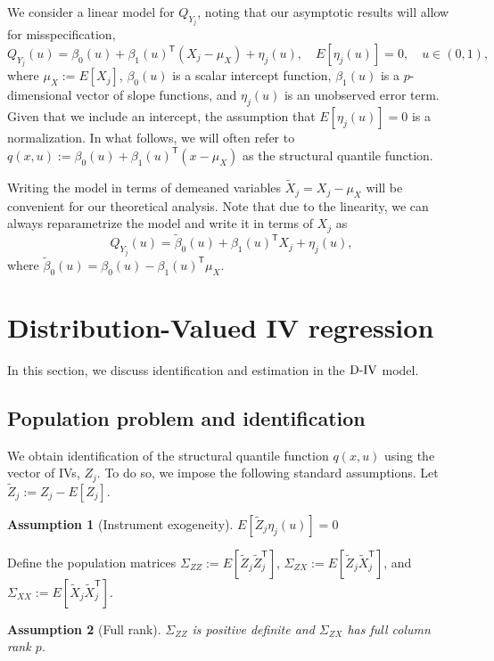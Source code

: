 \documentclass[12pt]{article}
\newcommand{\T}{\mathsf{T}} %
\newcommand{\est}{\ensuremath{\textnormal{D-IV}}\xspace}
\newtheorem{assumption}{Assumption}
\begin{document}
We consider a linear model for $Q_{Y_j}$, noting that our asymptotic results will allow for misspecification,
\begin{equation}\label{eq:linear_model}
  Q_{Y_j}(u) = \beta_0(u) + \beta_1(u)^{\!\T}(X_j-\mu_X) + \eta_j(u), \quad E[\eta_j(u)]=0, \quad u\in (0,1),
\end{equation}
where $\mu_X:=E[X_j]$, $\beta_0(u)$ is a scalar intercept function, $\beta_1(u)$ is a $p$-dimensional vector of slope functions, and $\eta_j(u)$ is an unobserved error term. Given that we include an intercept, the assumption that $E[\eta_j(u)]=0$ is a normalization. In what follows, we will often refer to $q(x,u):=\beta_0(u) + \beta_1(u)^{\!\T}(x-\mu_X)$ as the structural quantile function.

Writing the model in terms of demeaned variables $\tilde{X}_j=X_j-\mu_X$ will be convenient for our theoretical analysis. Note that due to the linearity, we can always reparametrize the model and write it in terms of $X_j$ as
\begin{equation*}
  Q_{Y_j}(u) = \tilde\beta_0(u) + \beta_1(u)^{\!\T}X_j + \eta_j(u),
\end{equation*}
where $\tilde\beta_0(u)=\beta_0(u)-\beta_1(u)^{\!\T}\mu_X$.

\section{Distribution-Valued IV regression}

In this section, we discuss identification and estimation in the \est model.

\subsection{Population problem and identification}
\label{sec:population_fivr_problem_identification}
We obtain identification of the structural quantile function $q(x,u)$ using the vector of IVs, $Z_j$. To do so, we impose the following standard assumptions. Let $\tilde{Z}_j:=Z_j-E[Z_j]$.
\begin{assumption}[Instrument exogeneity]\label{ass:instrument_exogeneity} $E\left[\tilde{Z}_j\eta_j(u)\right]=0$
\end{assumption}
Define the population matrices $\Sigma_{ZZ} := E[\tilde Z_j\tilde Z_j^{\T}]$, $\Sigma_{ZX} := E[\tilde Z_j \tilde{X}_j^{\T}]$, and $\Sigma_{XX} := E[\tilde{X}_j \tilde{X}_j^{\!\T}]$.
\begin{assumption}[Full rank] \label{ass:full_rank}
$\Sigma_{ZZ}$ is positive definite and $\Sigma_{ZX}$ has full column rank $p$.
\end{assumption}
\end{document}
